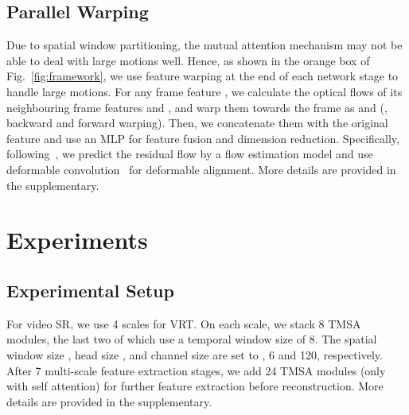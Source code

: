 \documentclass[10pt,twocolumn,letterpaper]{article}
\newlength \g
\begin{document}
\subsection{Parallel Warping}
\label{sec:paw}
Due to spatial window partitioning, the mutual attention mechanism may not be able to deal with large motions well. Hence, as shown in the orange box of Fig.~\ref{fig:framework}, we use feature warping at the end of each network stage to handle large motions. For any frame feature , we calculate the optical flows of its neighbouring frame features  and , and warp them towards the frame  as  and  (\ie, backward and forward warping). Then, we concatenate them with the original feature and use an MLP for feature fusion and dimension reduction. Specifically, following~\cite{chan2021basicvsr++}, we predict the residual flow by a flow estimation model and use deformable convolution~\cite{dai2017deformable} for deformable alignment. More details are provided in the supplementary.








\section{Experiments}
\subsection{Experimental Setup}
For video SR, we use 4 scales for VRT. On each scale, we stack 8 TMSA modules, the last two of which use a temporal window size of 8. The spatial window size , head size , and channel size  are set to ,  6 and 120, respectively. After 7 multi-scale feature extraction stages, we add 24 TMSA modules (only with self attention) for further feature extraction before reconstruction. More details are provided in the supplementary.
\end{document}

